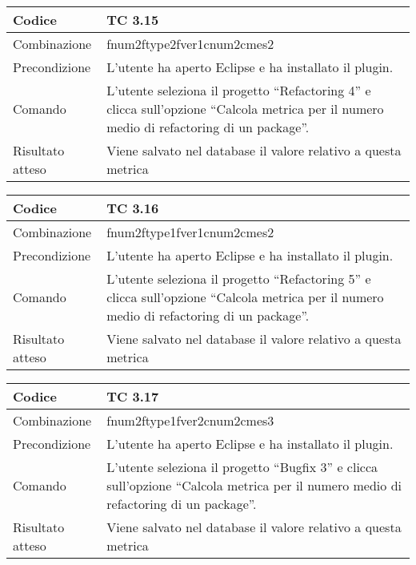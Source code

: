 \begin{table}[ht]
\begin{tabular}{|p{3cm}|p{9cm}|}
\hline
\cellcolor{lightgray}Codice				& TC 3.15								\\
\hline
\cellcolor{lightgray}Combinazione		& fnum2ftype2fver1cnum2cmes2  									\\
\hline
\cellcolor{lightgray}Precondizione		& L'utente ha aperto Eclipse e ha installato il plugin.			\\
\hline
\cellcolor{lightgray}Comando			& L'utente seleziona il progetto ``Refactoring 4''  e clicca sull'opzione 
``Calcola metrica per il numero medio di refactoring di un package''.	\\
\hline
\cellcolor{lightgray}Risultato atteso	& Viene salvato nel database il valore relativo a questa metrica	\\
\hline
\end{tabular}
\end{table}

\begin{table}[ht]
\begin{tabular}{|p{3cm}|p{9cm}|}
\hline
\cellcolor{lightgray}Codice				& TC 3.16								\\
\hline
\cellcolor{lightgray}Combinazione		& fnum2ftype1fver1cnum2cmes2 									\\
\hline
\cellcolor{lightgray}Precondizione		& L'utente ha aperto Eclipse e ha installato il plugin.				\\
\hline
\cellcolor{lightgray}Comando			& L'utente seleziona il progetto ``Refactoring 5''  e clicca sull'opzione ``Calcola metrica per il numero medio di refactoring di un package''.	\\
\hline
\cellcolor{lightgray}Risultato atteso	& Viene salvato nel database il valore relativo a questa metrica	\\
\hline
\end{tabular}
\end{table}

\begin{table}[ht]
\begin{tabular}{|p{3cm}|p{9cm}|}
\hline
\cellcolor{lightgray}Codice				& TC 3.17								\\
\hline
\cellcolor{lightgray}Combinazione		& fnum2ftype1fver2cnum2cmes3 								\\
\hline
\cellcolor{lightgray}Precondizione		& L'utente ha aperto Eclipse e ha installato il plugin.									\\
\hline
\cellcolor{lightgray}Comando			& L'utente seleziona il progetto ``Bugfix 3''  e clicca sull'opzione ``Calcola metrica per il numero medio di refactoring di un package''.	\\
\hline
\cellcolor{lightgray}Risultato atteso	& Viene salvato nel database il valore relativo a questa metrica	\\
\hline
\end{tabular}
\end{table}

